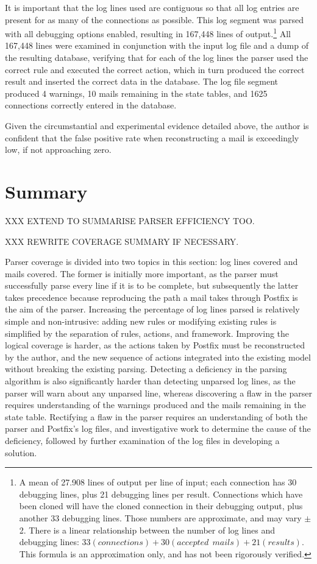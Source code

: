 It is important that the log lines used are contiguous so that all log
entries are present for as many of the connections as possible.  This log
segment was parsed with all debugging options enabled, resulting in 167,448
lines of output.\footnote{A mean of 27.908 lines of output per line of
input; each connection has 30 debugging lines, plus 21 debugging lines per
result.  Connections which have been cloned will have the cloned connection
in their debugging output, plus another 33 debugging lines.  Those numbers
are approximate, and may vary $\pm{}$ 2.  There is a linear relationship
between the number of log lines and debugging lines: $33(connections) +
30(accepted~~mails) + 21(results)$.  This formula is an approximation only,
and has not been rigorously verified.}  All 167,448 lines were examined in
conjunction with the input log file and a dump of the resulting database,
verifying that for each of the log lines the parser used the correct rule
and executed the correct action, which in turn produced the correct result
and inserted the correct data in the database.  The log file segment
produced 4 warnings, 10 mails remaining in the state tables, and 1625
connections correctly entered in the database.

Given the circumstantial and experimental evidence detailed above, the
author is confident that the false positive rate when reconstructing a mail
is exceedingly low, if not approaching zero.

\section{Summary}

XXX EXTEND TO SUMMARISE PARSER EFFICIENCY TOO\@.

XXX REWRITE COVERAGE SUMMARY IF NECESSARY\@.

Parser coverage is divided into two topics in this section: log lines
covered and mails covered.  The former is initially more important, as the
parser must successfully parse every line if it is to be complete, but
subsequently the latter takes precedence because reproducing the path a
mail takes through Postfix is the aim of the parser.  Increasing the
percentage of log lines parsed is relatively simple and non-intrusive:
adding new rules or modifying existing rules is simplified by the
separation of rules, actions, and framework.  Improving the logical
coverage is harder, as the actions taken by Postfix must be reconstructed
by the author, and the new sequence of actions integrated into the existing
model without breaking the existing parsing.  Detecting a deficiency in the
parsing algorithm is also significantly harder than detecting unparsed log
lines, as the parser will warn about any unparsed line, whereas discovering
a flaw in the parser requires understanding of the warnings produced and
the mails remaining in the state table.  Rectifying a flaw in the parser
requires an understanding of both the parser and Postfix's log files, and
investigative work to determine the cause of the deficiency, followed by
further examination of the log files in developing a solution.

